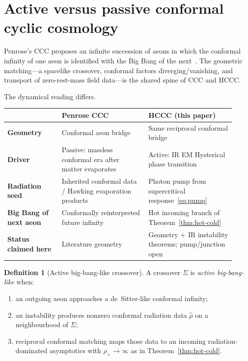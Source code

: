 \documentclass[11pt]{article}
\theoremstyle{definition}
\newtheorem{definition}[theorem]{Definition}
\theoremstyle{remark}
\begin{document}
\section{Active versus passive conformal cyclic cosmology}
\label{sec:active}
Penrose's CCC proposes an infinite succession of aeons in which the conformal infinity of one
aeon is identified with the Big Bang of the next~\cite{Penrose2006,Penrose2010,Penrose2013CCC}.
The geometric matching---a spacelike crossover, conformal factors diverging/vanishing, and
transport of zero-rest-mass field data---is the shared spine of CCC and HCCC.

The dynamical reading differs.
\begin{center}
\begin{tabular}{@{}>{\bfseries}p{0.22\linewidth}p{0.35\linewidth}p{0.35\linewidth}@{}}
\toprule
& Penrose CCC & HCCC (this paper)\\
\midrule
Geometry & Conformal aeon bridge & Same reciprocal conformal bridge\\
Driver & Passive: massless conformal era after matter evaporates & Active: IR EM Hysterical phase transition\\
Radiation seed & Inherited conformal data / Hawking evaporation products & Photon pump from supercritical response~\eqref{eq:pump}\\
Big Bang of next aeon & Conformally reinterpreted future infinity & Hot incoming branch of Theorem~\ref{thm:hot-cold}\\
Status claimed here & Literature geometry & Geometry + IR instability theorems; pump/junction open\\
\bottomrule
\end{tabular}
\end{center}

\begin{definition}[Active big-bang-like crossover]
\label{def:active-bang}
A crossover $\Sigma$ is \emph{active big-bang-like} when:
\begin{enumerate}
\item an outgoing aeon approaches a de~Sitter-like conformal infinity;
\item an instability produces nonzero conformal radiation data $\hat\rho$ on a neighbourhood of
$\Sigma$;
\item reciprocal conformal matching maps those data to an incoming radiation-dominated
asymptotics with $\rho_+\to\infty$ as in Theorem~\ref{thm:hot-cold}.
\end{enumerate}
\end{definition}
\end{document}
